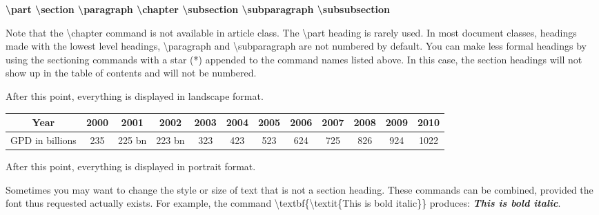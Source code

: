 \documentclass[a4paper,11pt,UTF8,openright]{book}
\begin{document}
\textbf{\textbackslash part \textbackslash section \textbackslash paragraph
\textbackslash chapter \textbackslash subsection \textbackslash subparagraph
\textbackslash subsubsection}

Note that the \textbackslash chapter command is not available in article class. The \textbackslash part heading is rarely used. In most document classes, headings made with the lowest level headings, \textbackslash paragraph and \textbackslash subparagraph are not numbered by default. You can make less formal headings by using the sectioning commands with a star (*) appended to the  command names listed above. In this case, the section headings will
not show up in the table of contents and will not be numbered.

\begin{landscape}
  After this point, everything is displayed in landscape format.
  
  \begin{tabular}{|c|c|c|c|c|c|c|c|c|c|c|c|}
    \hline
    Year & 2000 & 2001 & 2002 & 2003 & 2004 & 2005 & 2006 & 2007 & 2008 & 2009 & 2010 \\
    \hline 
    GPD in billions & 235  &  225 bn & 223 bn & 323 & 423  & 523 & 624 & 725 & 826  & 924  & 1022  \\
    \hline 
  \end{tabular}
\end{landscape}

After this point, everything is displayed in portrait format.

Sometimes you may want to change the style or size of text that is not a section heading. These commands can be combined, provided the font thus requested actually exists. For example, the command \textbackslash textbf\{\textbackslash textit\{This is bold italic\}\} produces: \textbf{\textit{This is bold italic}}.
\end{document}
